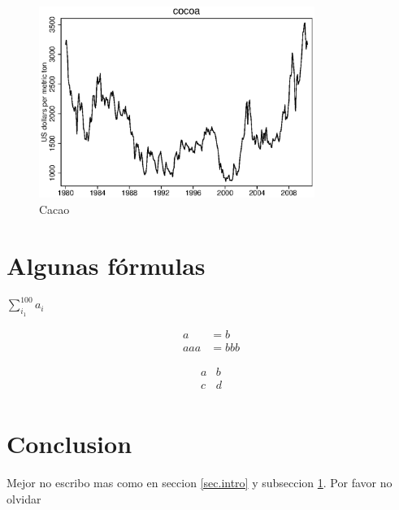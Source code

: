 \documentclass{article}
\begin{document}
    \begin{figure}[h]
    \centering
    \includegraphics[width=0.8\textwidth, angle=0]{acocoa.eps}
    \caption{Cacao}
    \label{cacao}
    \end{figure}

\section{Algunas f\'ormulas}\label{sec.intro.explicacion}

    $\sum_{i_1}^{100} a_i$
    
    \begin{align}
      a &= b \\
      aaa &= bbb
    \end{align}
    
    $$
    \begin{matrix}
    a & b \\
    c & d \\
    \end{matrix}
    $$

\section{Conclusion}\label{sec.conclusion}
    Mejor no escribo mas como en seccion \ref{sec.intro} y subseccion \ref{sec.intro.explicacion}. Por favor no olvidar \cite{ben1994inventory}

\newpage
    
    
\end{document}
